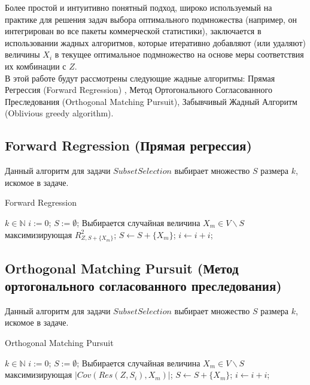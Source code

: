 \documentclass[preprint,12pt]{elsarticle}
\begin{document}
Более простой и интуитивно понятный подход, широко используемый на практике для решения задач выбора оптимального подмножества (например, он интегрирован во все пакеты коммерческой статистики), заключается в использовании жадных алгоритмов, которые итеративно добавляют (или удаляют) величины $X_i$ в текущее оптимальное подмножество на основе меры соответствия их комбинации с $Z$.\\

В этой работе будут рассмотрены следующие жадные алгоритмы: Прямая Регрессия (Forward Regression) \cite{miller2002subset}, Метод Ортогонального Согласованного Преследования (Orthogonal Matching Pursuit)\cite{tropp2004greed}, Забывчивый Жадный Алгоритм (Oblivious greedy algorithm).

\subsection{Forward Regression (Прямая регрессия)}
Данный алгоритм для задачи $Subset Selection$ выбирает множество $S$ размера $k$, искомое в задаче. 

\begin{algorithm}%
\caption{Forward Regression}\label{algo::fg1}
\begin{algorithmic}[1]
\Require $k \in \mathbb{N}$
\State $i := 0$;
\State $S := \emptyset$;
\State Выбирается случайная величина $X_m \in V \backslash S$ максимизирующая $R_{Z, S + \{X_m\}}^{2}$;
\State $S \gets S + \{X_m\}$;
\State $i \gets i + i$;
\EndWhile
\end{algorithmic}
\end{algorithm}

\subsection{Orthogonal Matching Pursuit (Метод ортогонального согласованного преследования)}
Данный алгоритм для задачи $Subset Selection$ выбирает множество $S$ размера $k$, искомое в задаче. 

\begin{algorithm}%
\caption{Orthogonal Matching Pursuit}\label{algo::fg2}
\begin{algorithmic}[1]
\Require $k \in \mathbb{N}$
\State $i := 0$;
\State $S := \emptyset$;
\State Выбирается случайная величина $X_m \in V \backslash S$ максимизирующая $|Cov(Res(Z, S_i), X_m)|$;
\State $S \gets S + \{X_m\}$;
\State $i \gets i + i$;
\EndWhile
\end{algorithmic}
\end{algorithm}
\end{document}
